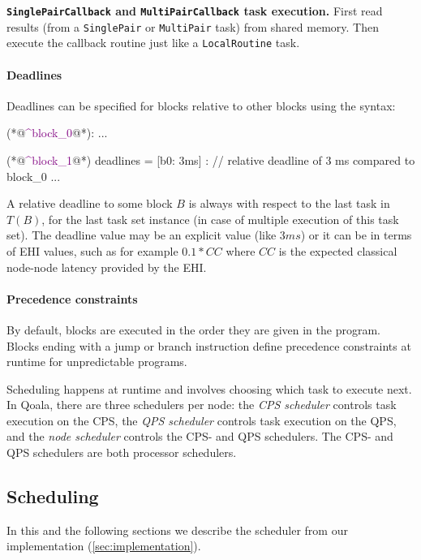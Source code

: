 \textbf{\texttt{SinglePairCallback} and \texttt{MultiPairCallback} task execution.} First read results (from a \texttt{SinglePair} or \texttt{MultiPair} task) from shared memory. Then execute the callback routine just like a \texttt{LocalRoutine} task.

\paragraph{Deadlines}
Deadlines can be specified for blocks relative to other blocks using the syntax:

\begin{qoalacode}[caption=Pseudocode for the Algorithm, label=lst:pseudocode]
(*@\textcolor{purple}{\textasciicircum block\_0}@*):
    ...

(*@\textcolor{purple}{\textasciicircum block\_1}@*) { deadlines = [b0: 3ms] }:  // relative deadline of 3 ms compared to block_0
    ...
\end{qoalacode}

A relative deadline to some block $B$ is always with respect to the last task in $T(B)$, for the last task set instance (in case of multiple execution of this task set).
The deadline value may be an explicit value (like $3 ms$) or it can be in terms of EHI values, such as for example $0.1 * CC$ where $CC$ is the expected classical node-node latency provided by the EHI.

\paragraph{Precedence constraints}
By default, blocks are executed in the order they are given in the program.
Blocks ending with a jump or branch instruction define precedence constraints at runtime for unpredictable programs.

Scheduling happens at runtime and involves choosing which task to execute next.
In Qoala, there are three schedulers per node: the \textit{CPS scheduler} controls task execution on the CPS,
the \textit{QPS scheduler} controls task execution on the QPS, and the \textit{node scheduler} controls the CPS- and QPS schedulers.
The CPS- and QPS schedulers are both processor schedulers.

\subsection{Scheduling}
In this and the following sections we describe the scheduler from our implementation (\cref{sec:implementation}).

